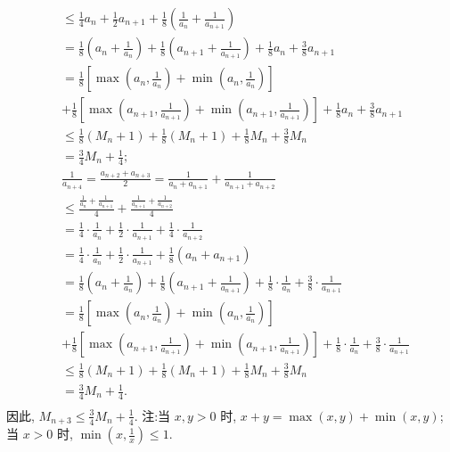 $$
\begin{aligned}
& \leqslant \frac{1}{4} a_n+\frac{1}{2} a_{n+1}+\frac{1}{8}\left(\frac{1}{a_n}+\frac{1}{a_{n+1}}\right) \\
& =\frac{1}{8}\left(a_n+\frac{1}{a_n}\right)+\frac{1}{8}\left(a_{n+1}+\frac{1}{a_{n+1}}\right)+\frac{1}{8} a_n+\frac{3}{8} a_{n+1} \\
& =\frac{1}{8}\left[\max \left(a_n, \frac{1}{a_n}\right)+\min \left(a_n, \frac{1}{a_n}\right)\right] \\
& +\frac{1}{8}\left[\max \left(a_{n+1}, \frac{1}{a_{n+1}}\right)+\min \left(a_{n+1}, \frac{1}{a_{n+1}}\right)\right]+\frac{1}{8} a_n+\frac{3}{8} a_{n+1} \\
& \leqslant \frac{1}{8}\left(M_n+1\right)+\frac{1}{8}\left(M_n+1\right)+\frac{1}{8} M_n+\frac{3}{8} M_n \\
& =\frac{3}{4} M_n+\frac{1}{4} ; \\
& \frac{1}{a_{n+4}}=\frac{a_{n+2}+a_{n+3}}{2}=\frac{1}{a_n+a_{n+1}}+\frac{1}{a_{n+1}+a_{n+2}} \\
& \leqslant \frac{\frac{1}{a_n}+\frac{1}{a_{n+1}}}{4}+\frac{\frac{1}{a_{n+1}}+\frac{1}{a_{n+2}}}{4} \\
& =\frac{1}{4} \cdot \frac{1}{a_n}+\frac{1}{2} \cdot \frac{1}{a_{n+1}}+\frac{1}{4} \cdot \frac{1}{a_{n+2}} \\
& =\frac{1}{4} \cdot \frac{1}{a_n}+\frac{1}{2} \cdot \frac{1}{a_{n+1}}+\frac{1}{8}\left(a_n+a_{n+1}\right) \\
& =\frac{1}{8}\left(a_n+\frac{1}{a_n}\right)+\frac{1}{8}\left(a_{n+1}+\frac{1}{a_{n+1}}\right)+\frac{1}{8} \cdot \frac{1}{a_n}+\frac{3}{8} \cdot \frac{1}{a_{n+1}} \\
& =\frac{1}{8}\left[\max \left(a_n, \frac{1}{a_n}\right)+\min \left(a_n, \frac{1}{a_n}\right)\right] \\
& +\frac{1}{8}\left[\max \left(a_{n+1}, \frac{1}{a_{n+1}}\right)+\min \left(a_{n+1}, \frac{1}{a_{n+1}}\right)\right]+\frac{1}{8} \cdot \frac{1}{a_n}+\frac{3}{8} \cdot \frac{1}{a_{n+1}} \\
& \leqslant \frac{1}{8}\left(M_n+1\right)+\frac{1}{8}\left(M_n+1\right)+\frac{1}{8} M_n+\frac{3}{8} M_n \\
& =\frac{3}{4} M_n+\frac{1}{4} \text {. } \\
&
\end{aligned}
$$
因此, $M_{n+3} \leqslant \frac{3}{4} M_n+\frac{1}{4}$.
注:当 $x, y>0$ 时, $x+y=\max (x, y)+\min (x, y)$; 当 $x>0$ 时, $\min \left(x, \frac{1}{x}\right) \leqslant 1$.



